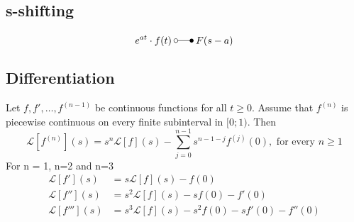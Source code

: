 \subsection{s-shifting}
\begin{equation*}
    e^{at}\cdot f(t)\:\laplace\:F(s-a)
\end{equation*}

\subsection{Differentiation}
Let $f, f', \dots, f^{(n-1)}$ be continuous functions for all $t \geq 0$. Assume that $f^{(n)}$ is piecewise continuous on every finite subinterval in $[0;1)$. Then
\begin{equation*}
    \mathcal{L}[f^{(n)}](s)=s^n\mathcal{L}[f](s)-\sum_{j=0}^{n-1}s^{n-1-j}f^{(j)}(0),\text{ for every }n\geq1
\end{equation*}
For n = 1, n=2 and n=3
\begin{align*}
    \mathcal{L}[f'](s)&=s\mathcal{L}[f](s)-f(0) \\
    \mathcal{L}[f''](s)&=s^2\mathcal{L}[f](s)-sf(0)-f'(0) \\
    \mathcal{L}[f'''](s)&=s^3\mathcal{L}[f](s)-s^2f(0)-sf'(0)-f''(0)
\end{align*}

